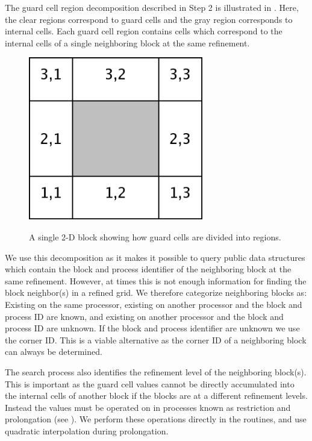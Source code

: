 
The guard cell region decomposition described in Step 2 is illustrated
in .  Here, the clear regions correspond to guard cells and
the gray region corresponds to internal cells.  Each guard cell region
contains cells which correspond to the internal cells of a single
neighboring block at the same refinement.

\begin{figure}[!ht]
\begin{center}
{\leavevmode\includegraphics[width=3in]{Grid_guardCell_divide}}
\end{center}
\caption[Division of guard cells in 2-D block]{\label{Fig:Grid_guardCell_divide} A
single 2-D block showing how guard cells are divided into regions.}
\end{figure}

We use this decomposition as it makes it possible to query public
\Paramesh data structures which contain the block and process
identifier of the neighboring block at the same refinement.  However, at times
this is not enough information for finding the block neighbor(s) in a
refined grid.  We therefore categorize neighboring blocks as: Existing
on the same processor, existing on another processor and the block and
process ID are known, and existing on another processor and the block
and process ID are unknown.  If the block and process identifier are
unknown we use the \flashx corner ID.  This is a viable
alternative as the corner ID of a neighboring block can always be
determined.

The search process also identifies the refinement level of the
neighboring block(s).  This is important as the guard cell values
cannot be directly accumulated into the internal cells of another block
if the blocks are at a different refinement levels.  Instead the
values must be operated on in processes known as restriction and
prolongation (see ).  We perform these
operations directly in the  routines, and
use quadratic interpolation during prolongation.

